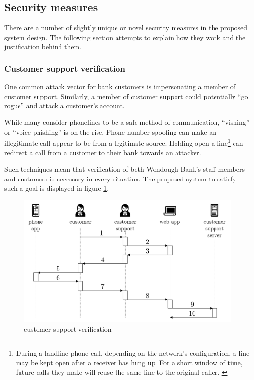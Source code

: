 \subsection{Security measures}

There are a number of slightly unique or novel security measures in the proposed system design. The following section attempts to explain how they work and the justification behind them.

\subsubsection{Customer support verification}

One common attack vector for bank customers is impersonating a member of customer support. Similarly, a member of customer support could potentially “go rogue” and attack a customer's account.

While many consider phonelines to be a safe method of communication, “vishing” or “voice phishing” is on the rise. \cite{bbcPhone} \cite{bbcSmishing} Phone number spoofing can make an illegitimate call appear to be from a legitimate source. Holding open a line\footnote{
    During a landline phone call, depending on the network's configuration, a line may be kept open after a receiver has hung up. For a short window of time, future calls they make will reuse the same line to the original caller. \cite{conArtists}
} can redirect a call from a customer to their bank towards an attacker.

Such techniques mean that verification of both Wondough Bank's staff members and customers is necessary in every situation. The proposed system to satisfy such a goal is displayed in figure \ref{customerSupport}.

\begin{figure}
    \includegraphics[width=\columnwidth]{images/customer-support}
    \caption{customer support verification}
    \centering
    \label{customerSupport}
\end{figure}

